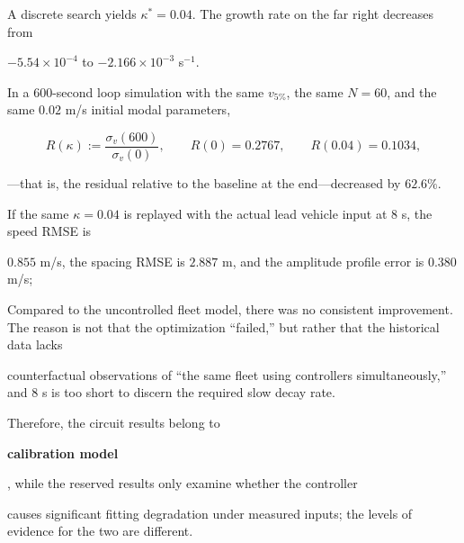 \documentclass[11pt,a4paper,openany]{book}
\numberwithin{equation}{chapter}
\numberwithin{figure}{chapter}
\numberwithin{table}{chapter}
\begin{document}
A discrete search yields $\kappa^*=0.04$. The growth rate on the far right decreases from

$-5.54\times10^{-4}$ to $-2.166\times10^{-3}$ s$^{-1}$.

In a 600-second loop simulation with the same $v_{5\%}$, the same $N=60$, and the same $0.02$ m/s initial modal parameters,

\[
R(\kappa):=\frac{\sigma_v(600)}{\sigma_v(0)},\qquad
R(0)=0.2767,\qquad R(0.04)=0.1034,
\]

—that is, the residual relative to the baseline at the end—decreased by $62.6\%$.




If the same $\kappa=0.04$ is replayed with the actual lead vehicle input at 8 s, the speed RMSE is

$0.855$ m/s, the spacing RMSE is $2.887$ m, and the amplitude profile error is $0.380$ m/s;

Compared to the uncontrolled fleet model, there was no consistent improvement. The reason is not that the optimization “failed,” but rather that the historical data lacks

counterfactual observations of “the same fleet using controllers simultaneously,” and 8 s is too short to discern the required slow decay rate.

Therefore, the circuit results belong to




\textbf{calibration model}




, while the reserved results only examine whether the controller

causes significant fitting degradation under measured inputs; the levels of evidence for the two are different.
\end{document}
